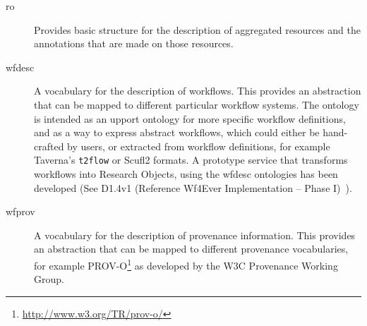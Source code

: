 \begin{description}
\item[ro] Provides basic structure for the description of aggregated
  resources and the annotations that are made on those resources.
\item[wfdesc] A vocabulary for the description of workflows. This
  provides an abstraction that can be mapped to different particular
  workflow systems. The ontology is intended as an upport ontology for more specific workflow definitions, and as a way to express abstract workflows, which could either be hand-crafted by users, or extracted from workflow definitions, for example Taverna's \texttt{t2flow} or Scufl2 formats. A prototype service that transforms workflows into Research Objects, using the wfdesc ontologies has been developed (See D1.4v1 (Reference Wf4Ever Implementation -- Phase I)~\cite{D1.4v1}). 
\item[wfprov] A vocabulary for the description of provenance
  information. This provides an abstraction that can be mapped to
  different provenance vocabularies, for example PROV-O\footnote{\url{http://www.w3.org/TR/prov-o/}} as developed by the W3C Provenance Working Group.
\end{description}




